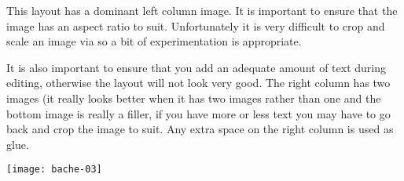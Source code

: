 \begin{bache}
This layout has a dominant left column image. It is important to
ensure that the image has an aspect ratio to suit. Unfortunately
it is very difficult to crop and scale an image via \tex so a bit
of experimentation is appropriate.

It is also important to ensure that you add an adequate amount
of text during editing, otherwise the layout will not look very good. The right
column has two images (it really looks better when it has two images rather than
one and the bottom image is really a filler, if you have more or less
text you may have to go back and crop the image to suit. Any extra space on the right column is used as glue.

\vfill
\texttt{[image: bache-03]}
\end{bache}



\restoregeometry
